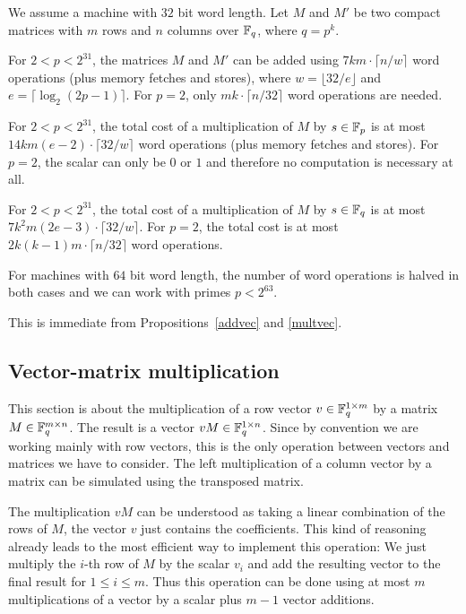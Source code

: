 \begin{Cor}
We assume a machine with $32$ bit word length. Let $M$ and $M'$ be 
two compact matrices with $m$ rows and $n$ columns over $\mathbb{F}_q$, where $q
= p^k$.

For\/ $2 < p < 2^{31}$, the matrices $M$ and $M'$
can be added using $7km\cdot \lceil n/w \rceil$
word operations
(plus memory fetches and stores), where $w = \lfloor 32/e \rfloor$
and $e = \lceil \log_2(2p-1) \rceil$. 
For $p=2$, only $mk \cdot \lceil n/32 \rceil$ word operations are needed.

For\/ $2 < p < 2^{31}$, the total cost of a multiplication of
$M$ by $s \in \mathbb{F}_p$ is at most 
$14km(e-2)\cdot \lceil 32/w \rceil$ word operations (plus memory fetches
and stores). For $p=2$, the scalar
can only be $0$ or $1$ and therefore no computation is necessary at all.

For\/ $2 < p < 2^{31}$, the total cost of a multiplication of $M$
by $s \in \mathbb{F}_q$ is at most
$7k^2m(2e-3)\cdot \lceil 32/w \rceil$.
 For $p = 2$, the total cost is
at most $2k(k-1)m \cdot \lceil n/32 \rceil$ word operations.

For machines with $64$ bit word length, the number of word operations
is halved in both cases and we can work with primes $p < 2^{63}$.
\end{Cor}
\Proof This is immediate from Propositions~\ref{addvec} and \ref{multvec}.
\ProofEnd

\subsection{Vector-matrix multiplication}
\label{ssec:vecmat}

This section is about the multiplication of a row vector 
$v \in \mathbb{F}_q^{1 \times m}$ by a matrix $M \in \mathbb{F}_q^{m \times n}$. The result
is a vector $vM \in \mathbb{F}_q^{1 \times n}$. Since by convention we are working 
mainly with row vectors, this is the only operation between vectors
and matrices we have to consider. The left multiplication of a column
vector by a matrix can be simulated using the transposed matrix.

The multiplication $vM$ can be understood as taking a linear combination
of the rows of $M$, the vector $v$ just contains the coefficients. This
kind of reasoning already leads to the most efficient way to implement
this operation: We just multiply the $i$-th row of $M$ by the scalar
$v_i$ and add the resulting vector to the final result for $1 \le i \le m$.
Thus this operation can be done using at most $m$ multiplications
of a vector by a scalar plus $m-1$ vector additions.

